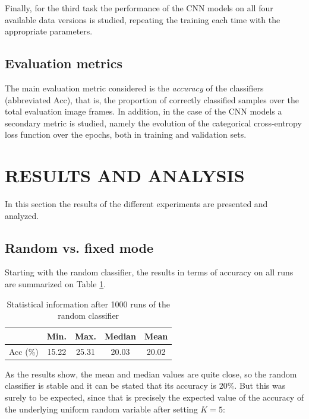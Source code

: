 \documentclass[letterpaper, 10 pt, conference]{IEEEtran}
\begin{document}
Finally, for the third task the performance of the CNN models on all four available data versions is studied, repeating the training each time with the appropriate parameters.

\subsection{Evaluation metrics}

The main evaluation metric considered is the \textit{accuracy} of the classifiers (abbreviated Acc), that is, the proportion of correctly classified samples over the total evaluation image frames. In addition, in the case of the CNN models a secondary metric is studied, namely the evolution of the categorical cross-entropy loss function over the epochs, both in training and validation sets.


\section{RESULTS AND ANALYSIS}

In this section the results of the different experiments are presented and analyzed.

\subsection{Random vs. fixed mode}

Starting with the random classifier, the results in terms of accuracy on all runs are summarized on Table \ref{tab:random}.

\begin{table}[h!]
  \centering
  \begin{tabular}{c|cccc}
    & Min. & Max. & Median & Mean\\
    \hline
    Acc (\%) & 15.22 & 25.31 & 20.03 & 20.02
  \end{tabular}\vspace{1em}
  \caption{Statistical information after 1000 runs of the random classifier}
  \label{tab:random}
\end{table}

As the results show, the mean and median values are quite close, so the random classifier is stable and it can be stated that its accuracy is $20\%$. But this was surely to be expected, since that is precisely the expected value of the accuracy of the underlying uniform random variable after setting $K=5$:
\end{document}

